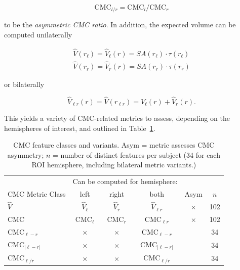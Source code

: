 \documentclass{article}
\begin{document}
\begin{equation} \label{eq:asym-ratio}
\text{CMC}_{l / r} = \text{CMC}_{l} / \text{CMC}_{r}
\end{equation}

to be the \emph{asymmetric CMC ratio}.  In addition, the expected volume can
be computed unilaterally

\begin{align} \label{eq:ev-unilateral}
\hat{V}(r_{\ell}) = \hat{V}_{\ell}(r) = SA(r_{\ell}) \cdot \tau(r_{\ell}) \\
\hat{V}(r_r) = \hat{V}_r(r) = SA(r_{r}) \cdot \tau(r_r)
\end{align}

or bilaterally

\begin{equation} \label{eq:ev-bilateral}
\hat{V}_{\ell r}(r) = \hat{V}(r_{\ell r}) = \hat{V}_{\ell}(r) + \hat{V}_r(r).
\end{equation}

This yields a variety of CMC-related metrics to assess, depending on the
hemispheres of interest, and outlined in Table~\ref{tab:cmc-variants}.

\begin{table}
\centering
\begin{tabular}{lccccc}
	\toprule

	                          &    \multicolumn{3}{c}{Can be computed for hemisphere:}  &       &      \\
  \cline{2-4}
	CMC Metric Class          &    left             &    right       & both             & Asym & $n$   \\
	\midrule
	$\hat{V}$                 & $\hat{V}_{\ell}$    & $\hat{V}_r$    & $\hat{V}_{\ell r}$        & $\times$   & 102 \\
	$\text{CMC}$              & $\text{CMC}_{\ell}$ & $\text{CMC}_r$ & $\text{CMC}_{\ell r}$     & $\times$   & 102 \\
	$\text{CMC}_{\ell - r}$   & $\times$            & $\times$       & $\text{CMC}_{\ell - r}$   & \checkmark &  34 \\
	$\text{CMC}_{|\ell - r|}$ & $\times$            & $\times$       & $\text{CMC}_{|\ell - r|}$ & \checkmark &  34 \\
	$\text{CMC}_{\ell / r}$   & $\times$            & $\times$       & $\text{CMC}_{\ell / r}$   & \checkmark &  34 \\
	\bottomrule
\end{tabular}
\footnotesize
\normalsize
\caption{CMC feature classes and variants. Asym = metric assesses CMC asymmetry; \(n\) = number of distinct features per subject (34 for each ROI hemisphere, including bilateral metric variants.)} \label{tab:cmc-variants}
\end{table}
\end{document}
